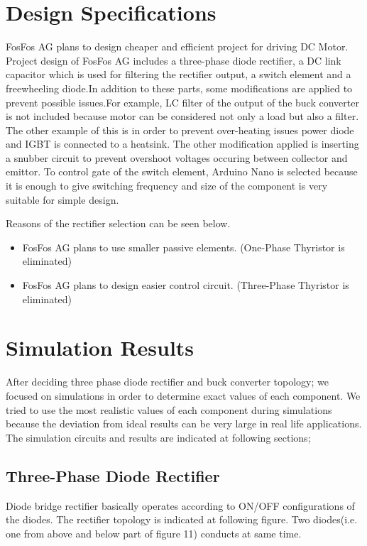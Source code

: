 \documentclass{article}
\begin{document}
\section{Design Specifications}%
FosFos AG plans to design cheaper and efficient project for driving DC Motor. Project design of FosFos AG includes a three-phase diode rectifier, a DC link capacitor which is used for filtering the rectifier output, a switch element and a freewheeling diode.In addition to these parts, some modifications are applied to prevent possible issues.For example, LC filter of the output of the buck converter is not included because motor can be considered not only a load but also a filter. The other example of this is in order to prevent over-heating issues power diode and IGBT is connected to a heatsink. The other modification applied is inserting a snubber circuit to prevent overshoot voltages occuring between collector and emittor. To control gate of the switch element, Arduino Nano is selected because it is enough to give switching frequency and size of the component is very suitable for simple design.
\par Reasons of the rectifier selection can be seen below.
\begin{itemize}
\item FosFos AG plans to use smaller passive elements. (One-Phase Thyristor is eliminated)
\item FosFos AG plans to design easier control circuit. (Three-Phase Thyristor is eliminated)
\end{itemize}
\newpage
\section{Simulation Results}
After deciding three phase diode rectifier and buck converter topology; we focused on simulations in order to determine exact values of each component. We tried to use the most realistic values of each component during simulations because the deviation from ideal results can be very large in real life applications. The simulation circuits and results are indicated at following sections;

\subsection{Three-Phase Diode Rectifier}
Diode bridge rectifier basically operates according to ON/OFF configurations of the diodes. The rectifier topology is indicated at following figure. Two diodes(i.e. one from above and below part of figure 11) conducts at same time. 
\end{document}
